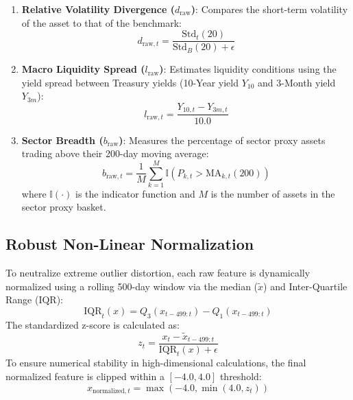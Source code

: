 \documentclass[11pt,a4paper]{article}
\begin{document}
\begin{enumerate}
    \item \textbf{Relative Volatility Divergence ($d_{\text{raw}}$)}: Compares the short-term volatility of the asset to that of the benchmark:
    \begin{equation}
        d_{\text{raw}, t} = \frac{\text{Std}_t(20)}{\text{Std}_B(20) + \epsilon}
    \end{equation}
    
    \item \textbf{Macro Liquidity Spread ($l_{\text{raw}}$)}: Estimates liquidity conditions using the yield spread between Treasury yields (10-Year yield $Y_{10}$ and 3-Month yield $Y_{3m}$):
    \begin{equation}
        l_{\text{raw}, t} = \frac{Y_{10, t} - Y_{3m, t}}{10.0}
    \end{equation}
    
    \item \textbf{Sector Breadth ($b_{\text{raw}}$)}: Measures the percentage of sector proxy assets trading above their 200-day moving average:
    \begin{equation}
        b_{\text{raw}, t} = \frac{1}{M} \sum_{k=1}^M \mathbb{I}(P_{k, t} > \text{MA}_{k, t}(200))
    \end{equation}
    where $\mathbb{I}(\cdot)$ is the indicator function and $M$ is the number of assets in the sector proxy basket.
\end{enumerate}

\subsection{Robust Non-Linear Normalization}

To neutralize extreme outlier distortion, each raw feature is dynamically normalized using a rolling 500-day window via the median ($\tilde{x}$) and Inter-Quartile Range ($\text{IQR}$):
\begin{equation}
    \text{IQR}_t(x) = Q_3(x_{t-499:t}) - Q_1(x_{t-499:t})
\end{equation}
The standardized z-score is calculated as:
\begin{equation}
    z_t = \frac{x_t - \tilde{x}_{t-499:t}}{\text{IQR}_t(x) + \epsilon}
\end{equation}
To ensure numerical stability in high-dimensional calculations, the final normalized feature is clipped within a $[-4.0, 4.0]$ threshold:
\begin{equation}
    x_{\text{normalized}, t} = \max\left(-4.0, \min\left(4.0, z_t\right)\right)
\end{equation}
\end{document}
